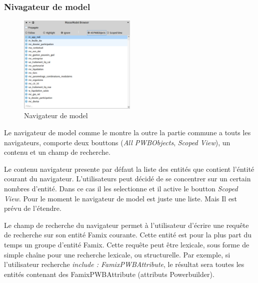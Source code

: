 \documentclass[a4paper]{article}
\begin{document}
\subsubsection{Nivagateur de model}
\begin{figure}[htbp]
  \begin{center}
  \includegraphics[width=0.5\textwidth]{./figures/modelBrowser.png}
  \caption{Navigateur de model}
  \label{fig:modelBrowser}
\end{center}
\vspace{-0.3cm}
\end{figure}
 Le navigateur de model comme le montre la  outre la partie commune a touts les navigateurs, comporte deux bouttons (\textit{All PWBObjects}, \textit{Scoped View}), un contenu et un champ de recherche.
 
Le contenu navigateur presente par défaut la liste des entités que contient l'éntité courant du navigateur. 
L'utilisateurs peut décidé de se concentrer sur un certain nombres d'entité. Dans ce cas il les selectionne et il active le boutton  \textit{Scoped View}.
Pour le moment le navigateur de model est juste une liste. Mais Il est prévu de l'étendre.

Le champ de recherche du navigateur permet à l'utilisateur d'écrire une requête de recherche sur son entité Famix courante.
 Cette entité est pour la plus part du temps un groupe d'entité Famix.
Cette requête peut être lexicale, sous forme de simple chaîne pour une recherche lexicale, ou structurelle.
Par exemple, si l'utilisateur recherche \textit{include : FamixPWBAttribute}, le résultat sera toutes les entités contenant des FamixPWBAttribute (attributs Powerbuilder).
\end{document}

